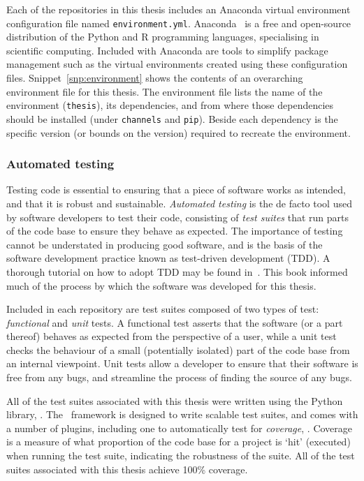 Each of the repositories in this thesis includes an Anaconda virtual environment
configuration file named \texttt{environment.yml}.
Anaconda~\cite{anaconda} is a free and open-source distribution of the Python
and R programming languages, specialising in scientific computing. Included with
Anaconda are tools to simplify package management such as the virtual
environments created using these configuration files.
Snippet~\ref{snp:environment} shows the contents of an overarching environment
file for this thesis. The environment file lists the name of the environment
(\texttt{thesis}), its dependencies, and from where those
dependencies should be installed (under \texttt{channels} and
\texttt{pip}). Beside each dependency is the specific version (or
bounds on the version) required to recreate the environment.

\subsubsection{Automated testing}

Testing code is essential to ensuring that a piece of software works as
intended, and that it is robust and sustainable. \emph{Automated testing} is the
de facto tool used by software developers to test their code, consisting of
\emph{test suites} that run parts of the code base to ensure they behave as
expected. The importance of testing cannot be understated in producing good
software, and is the basis of the software development practice known as
test-driven development (TDD). A thorough tutorial on how to adopt TDD may be
found in~\cite{Percival2017}. This book informed much of the process by which
the software was developed for this thesis. 

Included in each repository are test suites composed of two types of test:
\emph{functional} and \emph{unit} tests. A functional test asserts that the
software (or a part thereof) behaves as expected from the perspective of a user,
while a unit test checks the behaviour of a small (potentially isolated) part of
the code base from an internal viewpoint. Unit tests allow a developer to ensure
that their software is free from any bugs, and streamline the process of finding
the source of any bugs.

All of the test suites associated with this thesis were written using the Python
library, \href{https://docs.pytest.org/en/stable/}{\pytest}. The \pytest\
framework is designed to write scalable test suites, and comes with a number of
plugins, including one to automatically test for \emph{coverage},
\href{https://pytest-cov.readthedocs.io/en/latest/}{\pytestcov}.
Coverage is a measure of what proportion of the code base for a project is `hit'
(executed) when running the test suite, indicating the robustness of the suite.
All of the test suites associated with this thesis achieve 100\% coverage.

